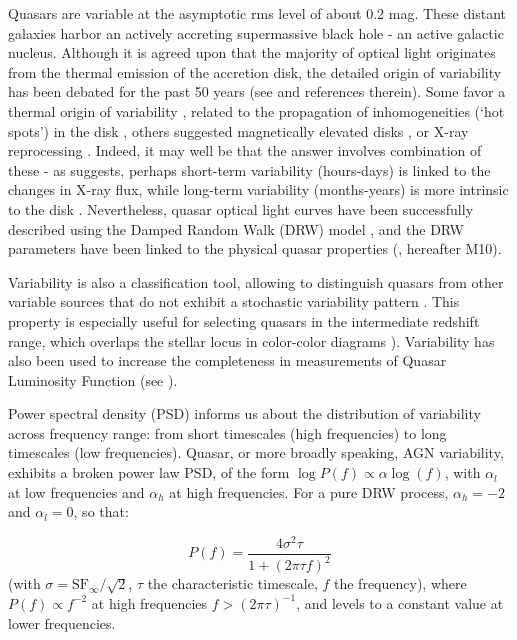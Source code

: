 \documentclass[twocolumn]{aastex62}
\begin{document}
Quasars are variable at the asymptotic rms level of about 0.2 mag. These distant galaxies harbor an actively accreting supermassive black hole - an active galactic nucleus. Although it is agreed upon that the majority of optical light originates from the thermal emission of the accretion disk, the detailed origin of variability has been debated for the past 50 years (see \citealt{sun2018} and references therein). Some favor a thermal origin of variability \citep{kelly2013}, related to the propagation of inhomogeneities (`hot spots') in the disk \citep{dexter2011, cai2016}, others suggested magnetically elevated disks \citep{dexter2019}, or X-ray reprocessing  \citep{kubota2018}.  Indeed, it may well be that the answer involves combination of these -  as \cite{sanchez2018} suggests, perhaps short-term variability (hours-days) is linked to the changes in X-ray flux, while long-term variability (months-years) is more intrinsic to the disk \citep{edelson2015,lira2015}. Nevertheless, quasar optical light curves have been successfully described using the Damped Random Walk (DRW) model \citep{kelly2009, macleod2010, kozlowski2010, zu2011, kasliwal2015a}, and the DRW parameters have been linked to the physical quasar properties (\citealt{macleod2010}, hereafter M10). 

Variability is also a classification tool, allowing to distinguish quasars from other variable sources that do not exhibit a stochastic variability pattern \citep{macleod2011}. This property is especially useful for selecting quasars in the intermediate redshift range, which overlaps the stellar locus in color-color diagrams \citep{sesar2007, yang2017}). Variability has also been used to increase the completeness in measurements of Quasar Luminosity Function (see \citealt{ ross2013, palanque2013, alsayyad2016, mcgreer2013, mcgreer2018}). 

Power spectral density (PSD) informs us about the distribution of variability across frequency range: from short timescales (high frequencies) to long timescales (low frequencies). Quasar, or more broadly speaking, AGN variability, exhibits a broken power law PSD, of the form 
$\log{P(f)} \propto \alpha \log{(f)}$, with $\alpha_l$ at low frequencies and $\alpha_h$ at high frequencies. For a pure DRW process,  $\alpha_{h}{=}-2$ and $\alpha_{l}{=}0$, so that:

\begin{equation}
P(f) = \frac{4\sigma^{2}\tau}{1+(2 \pi \tau f)^{2}}
\end{equation}
(with $\sigma = \mathrm{SF}_{\infty} / \sqrt{2}$, $\tau$ the characteristic timescale, $f$ the frequency), where $P(f) \propto f^{-2}$  at high frequencies $f > (2\pi \tau)^{-1}$, and levels to a constant value at lower frequencies\citep{kelly2014}. 
\end{document}
